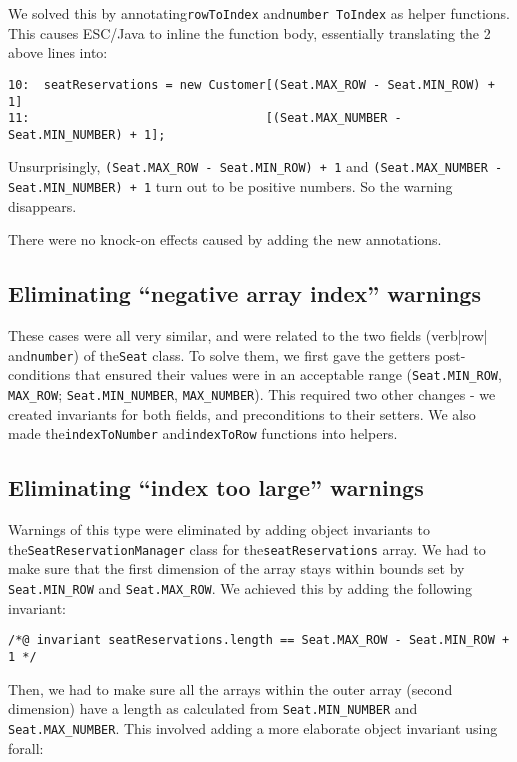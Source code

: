 \documentclass{article}
\begin{document}
We solved this by annotating\verb|rowToIndex| and\verb|number ToIndex| as helper functions. This causes ESC/Java to inline the function body, essentially translating the 2 above lines into:

\noindent
\begin{verbatim}
10:  seatReservations = new Customer[(Seat.MAX_ROW - Seat.MIN_ROW) + 1]
11:                                 [(Seat.MAX_NUMBER - Seat.MIN_NUMBER) + 1];
\end{verbatim}

Unsurprisingly, \verb|(Seat.MAX_ROW - Seat.MIN_ROW) + 1| and
\verb|(Seat.MAX_NUMBER - Seat.MIN_NUMBER) + 1| turn out to be positive numbers. So the warning disappears.

There were no knock-on effects caused by adding the new annotations.

\subsection{Eliminating ``negative array index'' warnings}

These cases were all very similar, and were related to the two fields (verb|row| and\verb|number|) of the\verb|Seat| class. To solve them, we first gave the getters post-conditions that ensured their values were in an acceptable range (\verb|Seat.MIN_ROW|, \verb|MAX_ROW|; \verb|Seat.MIN_NUMBER|, \verb|MAX_NUMBER|). This required two other changes - we created invariants for both fields, and preconditions to their setters. We also made the\verb|indexToNumber| and\verb|indexToRow| functions into helpers.

\subsection{Eliminating ``index too large'' warnings}

Warnings of this type were eliminated by adding object invariants to the\verb|SeatReservationManager| class for the\verb|seatReservations| array. We had to make sure that the first dimension of the array stays within bounds set by \verb|Seat.MIN_ROW| and \verb|Seat.MAX_ROW|. We achieved this by adding the following invariant:

\noindent
\begin{verbatim}
/*@ invariant seatReservations.length == Seat.MAX_ROW - Seat.MIN_ROW + 1 */
\end{verbatim}

Then, we had to make sure all the arrays within the outer array (second dimension) have a length as calculated from \verb|Seat.MIN_NUMBER| and \verb|Seat.MAX_NUMBER|. This involved adding a more elaborate object invariant using forall:
\end{document}
